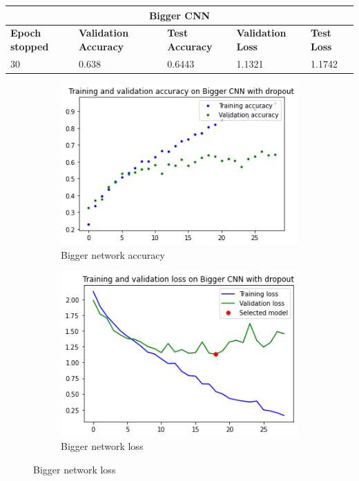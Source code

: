 \medskip

\begin{tabular}{ |p{2cm}|p{2cm}|p{2cm}|p{2cm}|p{2cm}|  }
\hline
\multicolumn{5}{|c|}{Bigger CNN} \\
\hline
\textbf{Epoch stopped} & \textbf{Validation Accuracy} & \textbf{Test Accuracy} & \textbf{Validation Loss} & \textbf{Test Loss} \\
\hline
30 & 0.638 & 0.6443 & 1.1321 & 1.1742\\
\hline
\end{tabular}

\medskip


\begin{figure}[H]
	\begin{subfigure}{0.5\textwidth}
		\includegraphics[width=0.9\linewidth]{img/scratch/bigger_acc.png} 
		\caption{Bigger network accuracy}
		\label{fig:BiggerCNNacc}
	\end{subfigure}
	\begin{subfigure}{0.5\textwidth}
		\includegraphics[width=0.9\linewidth]{img/scratch/bigger_loss.png}
		\caption{Bigger network loss}
		\label{fig:BiggerCNNloss}
	\end{subfigure}
\end{figure}

